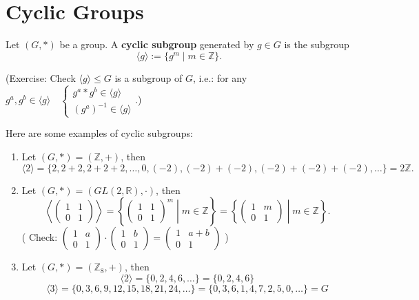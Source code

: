 \section{Cyclic Groups}

\begin{definition}
Let $(G, *)$ be a group. A {\bf cyclic subgroup} generated by $g \in G$ is the subgroup $$\langle g \rangle := \{ g^m \mid m \in \mathbb{Z} \}.$$
\end{definition}
\noindent (Exercise: Check $\langle g \rangle \le G$ is a subgroup of $G$, i.e.: for any
$g^a, g^b \in \langle g \rangle \quad \begin{cases} g^a * g^b \in \langle g \rangle \\ (g^a)^{-1} \in \langle g \rangle \end{cases}$.)

\begin{example}
Here are some examples of cyclic subgroups:
\begin{enumerate}
    \item Let $(G, *) = (\mathbb{Z}, +)$, then 
    $$\langle 2 \rangle = \{ 2, 2+2, 2+2+2, \dots, 0, (-2), (-2)+(-2), (-2)+(-2)+(-2), \dots \} = 2\mathbb{Z}.$$
    
    \item Let $(G, *) = (GL(2, \mathbb{R}), \cdot)$, then    $$\left\langle \begin{pmatrix} 1 & 1 \\ 0 & 1 \end{pmatrix} \right\rangle = \left\{ \begin{pmatrix} 1 & 1 \\ 0 & 1 \end{pmatrix}^m \middle| m \in \mathbb{Z} \right\} = \left\{ \begin{pmatrix} 1 & m \\ 0 & 1 \end{pmatrix} \middle| m \in \mathbb{Z} \right\}.$$ 
    ( Check: $\begin{pmatrix} 1 & a \\ 0 & 1 \end{pmatrix} \cdot \begin{pmatrix} 1 & b \\ 0 & 1 \end{pmatrix} = \begin{pmatrix} 1 & a+b \\ 0 & 1 \end{pmatrix}$ )
    
    \item Let $(G, *) = (\mathbb{Z}_8, +)$, then
    $$\langle 2 \rangle = \{ 0, 2, 4, 6, \dots \} = \{ 0, 2, 4, 6 \}$$
    $$\langle 3 \rangle = \{ 0, 3, 6, 9, 12, 15, 18, 21, 24, \dots \} = \{ 0, 3, 6, 1, 4, 7, 2, 5, 0, \dots \} = G$$
\end{enumerate}
\end{example}

